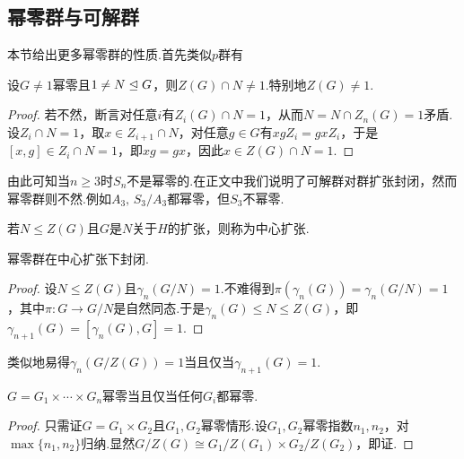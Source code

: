 \subsection{幂零群与可解群}\label{subsec:NilpotentSolvable}
本节给出更多幂零群的性质.首先类似$p$群有
\begin{prop}
	设$G\ne 1$幂零且$1\ne N\trianglelefteq G$，则$Z(G)\cap N\ne 1$.特别地$Z(G)\ne 1$.
\end{prop}
\begin{proof}
	若不然，断言对任意$i$有$Z_i(G)\cap N=1$，从而$N=N\cap Z_n(G)=1$矛盾.设$Z_i\cap N=1$，取$x\in Z_{i+1}\cap N$，对任意$g\in G$有$xgZ_i=gxZ_i$，于是$[x,g]\in Z_i\cap N=1$，即$xg=gx$，因此$x\in Z(G)\cap N=1$.
\end{proof}

由此可知当$n\ge 3$时$S_n$不是幂零的.在正文中我们说明了可解群对群扩张封闭，然而幂零群则不然.例如$A_3,\,S_3/A_3$都幂零，但$S_3$不幂零.

若$N\le Z(G)$且$G$是$N$关于$H$的扩张，则称为{\heiti 中心扩张}.
\begin{prop}
	幂零群在中心扩张下封闭.
\end{prop}
\begin{proof}
	设$N\le Z(G)$且$\gamma_n(G/N)=1$.不难得到$\pi(\gamma_n(G))=\gamma_n(G/N)=1$，其中$\pi\colon G\to G/N$是自然同态.于是$\gamma_n(G)\le N\le Z(G)$，即$\gamma_{n+1}(G)=[\gamma_n(G),G]=1$.
\end{proof}
\begin{remark}
	类似地易得$\gamma_n(G/Z(G))=1$当且仅当$\gamma_{n+1}(G)=1$.
\end{remark}
\begin{prop}
	$G=G_1\times\cdots\times G_n$幂零当且仅当任何$G_i$都幂零.
\end{prop}
\begin{proof}
	只需证$G=G_1\times G_2$且$G_1,G_2$幂零情形.设$G_1,G_2$幂零指数$n_1,n_2$，对$\max\{n_1,n_2\}$归纳.显然$G/Z(G)\cong G_1/Z(G_1)\times G_2/Z(G_2)$，即证.
\end{proof}

